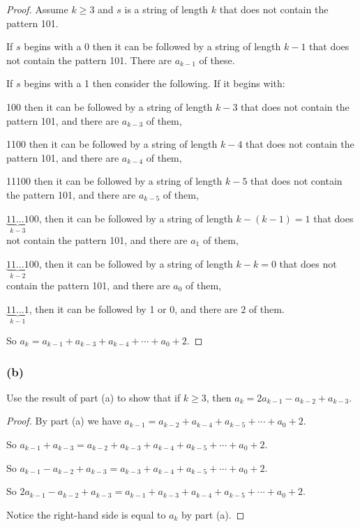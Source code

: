 \documentclass[14pt]{extarticle}
\begin{document}
\begin{proof}
Assume \(k \geq 3\) and $s$ is a string of length $k$ that does not contain the pattern 101.

If $s$ begins with a 0 then it can be followed by a string of length $k-1$ that does not contain the pattern 101.
There are \(a_{k-1}\) of these.

If $s$ begins with a 1 then consider the following. If it begins with:

100 then it can be followed by a string of length $k-3$ that does not contain the pattern 101, and there are 
\(a_{k-3}\) of them,

1100 then it can be followed by a string of length $k-4$ that does not contain the pattern 101, and there are 
\(a_{k-4}\) of them,

11100 then it can be followed by a string of length $k-5$ that does not contain the pattern 101, and there are 
\(a_{k-5}\) of them,

\(\underbrace{11\ldots 1}_{k-3}00\), then it can be followed by a string of length $k-(k-1) = 1$ that does not 
contain the pattern 101, and there are \(a_1\) of them,

\(\underbrace{11\ldots 1}_{k-2}00\), then it can be followed by a string of length $k-k = 0$ that does not 
contain the pattern 101, and there are \(a_0\) of them,

\(\underbrace{11\ldots 1}_{k-1}\), then it can be followed by 1 or 0, and there are \(2\) of them.

So \(a_k= a_{k-1} + a_{k-3} + a_{k-4} + \cdots + a_0 + 2\).
\end{proof}

\subsubsection{(b)}
Use the result of part (a) to show that if \(k \geq 3\), then \(a_k = 2a_{k-1} - a_{k-2} + a_{k-3}\).

\begin{proof}
By part (a) we have \(a_{k-1} = a_{k-2} + a_{k-4} + a_{k-5} + \cdots + a_0 + 2\).

So \(a_{k-1} + a_{k-3} = a_{k-2} + a_{k-3} + a_{k-4} + a_{k-5} + \cdots + a_0 + 2\).

So \(a_{k-1} - a_{k-2} + a_{k-3} = a_{k-3} + a_{k-4} + a_{k-5} + \cdots + a_0 + 2\).

So \(2a_{k-1} - a_{k-2} + a_{k-3} = a_{k-1} + a_{k-3} + a_{k-4} + a_{k-5} + \cdots + a_0 + 2\).

Notice the right-hand side is equal to \(a_k\) by part (a).
\end{proof}
\end{document}
